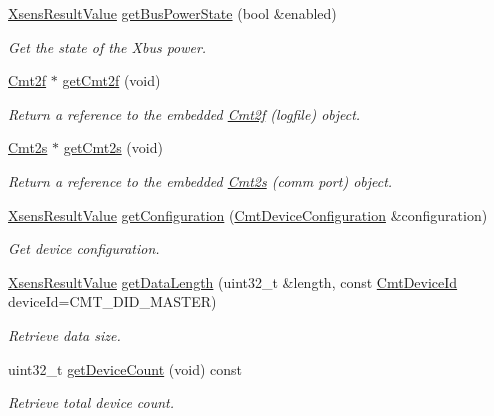 \begin{DoxyCompactItemize}
\hyperlink{group__enums_ga822a2260a20af524029eef9e9a51ff6f}{\-Xsens\-Result\-Value} \hyperlink{classxsens_1_1Cmt3_a7bcc6fa070858ff323a95cfbfe180b3a}{get\-Bus\-Power\-State} (bool \&enabled)
\begin{DoxyCompactList}\small\item\em \-Get the state of the \-Xbus power. \end{DoxyCompactList}\item 
\hyperlink{classxsens_1_1Cmt2f}{\-Cmt2f} $\ast$ \hyperlink{classxsens_1_1Cmt3_ad699811299809b41e9a6319325c8d5a5}{get\-Cmt2f} (void)
\begin{DoxyCompactList}\small\item\em \-Return a reference to the embedded \hyperlink{classxsens_1_1Cmt2f}{\-Cmt2f} (logfile) object. \end{DoxyCompactList}\item 
\hyperlink{classxsens_1_1Cmt2s}{\-Cmt2s} $\ast$ \hyperlink{classxsens_1_1Cmt3_a0ef77f82be7f1d473bbeaf30d7d0e669}{get\-Cmt2s} (void)
\begin{DoxyCompactList}\small\item\em \-Return a reference to the embedded \hyperlink{classxsens_1_1Cmt2s}{\-Cmt2s} (comm port) object. \end{DoxyCompactList}\item 
\hyperlink{group__enums_ga822a2260a20af524029eef9e9a51ff6f}{\-Xsens\-Result\-Value} \hyperlink{classxsens_1_1Cmt3_a51ea1bae3376935d8590c2ecc534758d}{get\-Configuration} (\hyperlink{structCmtDeviceConfiguration}{\-Cmt\-Device\-Configuration} \&configuration)
\begin{DoxyCompactList}\small\item\em \-Get device configuration. \end{DoxyCompactList}\item 
\hyperlink{group__enums_ga822a2260a20af524029eef9e9a51ff6f}{\-Xsens\-Result\-Value} \hyperlink{classxsens_1_1Cmt3_a3460c454c994b31c722ba09b6463ccdc}{get\-Data\-Length} (uint32\-\_\-t \&length, const \hyperlink{cmtdef_8h_a2e3b6a17360828d440ee848959918af2}{\-Cmt\-Device\-Id} device\-Id=\-C\-M\-T\-\_\-\-D\-I\-D\-\_\-\-M\-A\-S\-T\-E\-R)
\begin{DoxyCompactList}\small\item\em \-Retrieve data size. \end{DoxyCompactList}\item 
uint32\-\_\-t \hyperlink{classxsens_1_1Cmt3_a232a91bfbdb2c15363e19452230fe9ad}{get\-Device\-Count} (void) const 
\begin{DoxyCompactList}\small\item\em \-Retrieve total device count. \end{DoxyCompactList}\item 

\end{DoxyCompactItemize}
